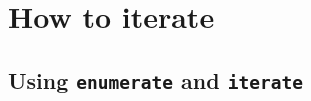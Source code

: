 \documentclass[]{book}
\newenvironment{Shaded}{\begin{snugshade}}{\end{snugshade}}
\newcommand{\CommentTok}[1]{\textcolor[rgb]{0.56,0.35,0.01}{\textit{#1}}}
\newcommand{\KeywordTok}[1]{\textcolor[rgb]{0.13,0.29,0.53}{\textbf{#1}}}
\newcommand{\NormalTok}[1]{#1}
\newcommand{\OperatorTok}[1]{\textcolor[rgb]{0.81,0.36,0.00}{\textbf{#1}}}
\newcommand{\StringTok}[1]{\textcolor[rgb]{0.31,0.60,0.02}{#1}}
\begin{document}
\hypertarget{how-to-iterate}{%
\section{How to iterate}\label{how-to-iterate}}

\hypertarget{using-enumerate-and-iterate}{%
\subsection{\texorpdfstring{Using \texttt{enumerate} and \texttt{iterate}}{Using enumerate and iterate}}\label{using-enumerate-and-iterate}}

\begin{Shaded}
\end{Shaded}
\end{document}

